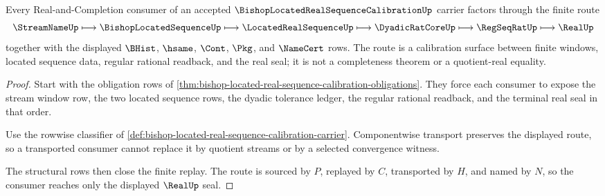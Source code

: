 \begin{theorem}
\label{thm:bishop-located-real-sequence-calibration-l10-route}
Every Real-and-Completion consumer of an accepted $\BishopLocatedRealSequenceCalibrationUp$ carrier factors through the finite route
$$
\StreamNameUp\longmapsto\BishopLocatedSequenceUp\longmapsto\LocatedRealSequenceUp\longmapsto\DyadicRatCoreUp\longmapsto\RegSeqRatUp\longmapsto\RealUp
$$
together with the displayed $\BHist$, $\hsame$, $\Cont$, $\Pkg$, and $\NameCert$ rows. The route is a calibration surface between finite windows, located sequence data, regular rational readback, and the real seal; it is not a completeness theorem or a quotient-real equality.
\end{theorem}
\begin{proof}
Start with the obligation rows of \autoref{thm:bishop-located-real-sequence-calibration-obligations}. They force each consumer to expose the stream window row, the two located sequence rows, the dyadic tolerance ledger, the regular rational readback, and the terminal real seal in that order.

Use the rowwise classifier of \autoref{def:bishop-located-real-sequence-calibration-carrier}. Componentwise transport preserves the displayed route, so a transported consumer cannot replace it by quotient streams or by a selected convergence witness.

The structural rows then close the finite replay. The route is sourced by $P$, replayed by $C$, transported by $H$, and named by $N$, so the consumer reaches only the displayed $\RealUp$ seal.
\end{proof}




